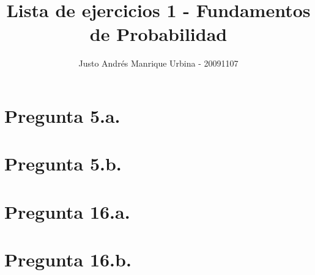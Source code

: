 \documentclass[11pt]{article}
\title{Lista de ejercicios 1 - Fundamentos de Probabilidad}
\begin{document}
\maketitle
\author{Justo Andrés Manrique Urbina - 20091107}

\section{Pregunta 5.a.}


\section{Pregunta 5.b.}


\section{Pregunta 16.a.}


\section{Pregunta 16.b.}
\end{document}
